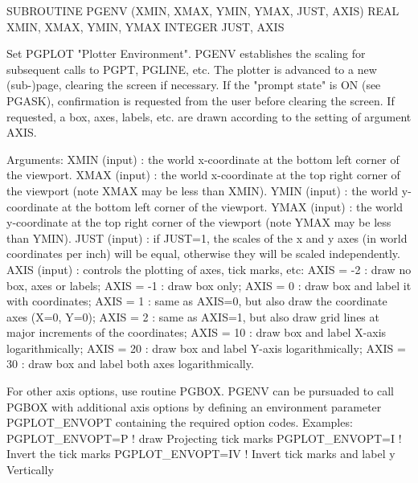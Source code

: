 {\eightpoint\begintt
      SUBROUTINE PGENV (XMIN, XMAX, YMIN, YMAX, JUST, AXIS)
      REAL XMIN, XMAX, YMIN, YMAX
      INTEGER JUST, AXIS
 
Set PGPLOT "Plotter Environment".  PGENV establishes the scaling
for subsequent calls to PGPT, PGLINE, etc.  The plotter is
advanced to a new (sub-)page, clearing the screen if necessary.
If the "prompt state" is ON (see PGASK), confirmation
is requested from the user before clearing the screen.
If requested, a box, axes, labels, etc. are drawn according to
the setting of argument AXIS.
 
Arguments:
 XMIN   (input)  : the world x-coordinate at the bottom left corner
                   of the viewport.
 XMAX   (input)  : the world x-coordinate at the top right corner
                   of the viewport (note XMAX may be less than XMIN).
 YMIN   (input)  : the world y-coordinate at the bottom left corner
                   of the viewport.
 YMAX   (input)  : the world y-coordinate at the top right corner
                   of the viewport (note YMAX may be less than YMIN).
 JUST   (input)  : if JUST=1, the scales of the x and y axes (in
                   world coordinates per inch) will be equal,
                   otherwise they will be scaled independently.
 AXIS   (input)  : controls the plotting of axes, tick marks, etc:
     AXIS = -2 : draw no box, axes or labels;
     AXIS = -1 : draw box only;
     AXIS =  0 : draw box and label it with coordinates;
     AXIS =  1 : same as AXIS=0, but also draw the
                 coordinate axes (X=0, Y=0);
     AXIS =  2 : same as AXIS=1, but also draw grid lines
                 at major increments of the coordinates;
     AXIS = 10 : draw box and label X-axis logarithmically;
     AXIS = 20 : draw box and label Y-axis logarithmically;
     AXIS = 30 : draw box and label both axes logarithmically.
 
For other axis options, use routine PGBOX. PGENV can be pursuaded to
call PGBOX with additional axis options by defining an environment
parameter PGPLOT_ENVOPT containing the required option codes. 
Examples:
  PGPLOT_ENVOPT=P      ! draw Projecting tick marks
  PGPLOT_ENVOPT=I      ! Invert the tick marks
  PGPLOT_ENVOPT=IV     ! Invert tick marks and label y Vertically
\endtt}

